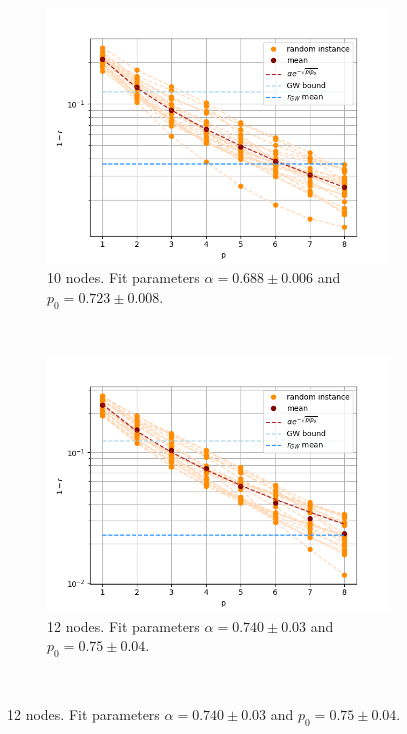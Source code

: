 \begin{figure}[H]
	\centering
	\begin{subfigure}[t]{0.45\textwidth}
		\centering
		\includegraphics[width=\textwidth]{figures/interp/FOM_(weighted)/SQR/FOM_3-regular-10-nodal_sqr}
		\caption{10 nodes. Fit parameters $\alpha = 0.688 \pm 0.006$ and $p_0 = 0.723 \pm 0.008$.}
	\end{subfigure}
	~
	\begin{subfigure}[t]{0.45\textwidth}
		\centering
		\includegraphics[width=\textwidth]{figures/interp/FOM_(weighted)/SQR/FOM_3-regular-12-nodal_sqr}
		\caption{12 nodes. Fit parameters $\alpha = 0.740 \pm 0.03$ and $p_0 = 0.75 \pm 0.04$.}
	\end{subfigure}
	\\

\end{figure}
